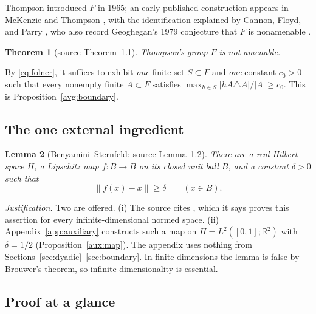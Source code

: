 \documentclass[11pt]{article}
\newcommand{\R}{\mathbb R}
\newcommand{\norm}[1]{\lVert #1\rVert}
\newtheorem{theorem}{Theorem}[section]
\newtheorem{lemma}[theorem]{Lemma}
\theoremstyle{definition}
\numberwithin{equation}{section}
\begin{document}
Thompson introduced \(F\) in 1965; an early published construction appears
in McKenzie and Thompson \cite{McKenzieThompson1973}, with the
identification explained by Cannon, Floyd, and Parry
\cite[pp.~215--216]{CannonFloydParry1996}, who also record Geoghegan's 1979
conjecture that \(F\) is nonamenable \cite[p.~227]{CannonFloydParry1996}.

\begin{theorem}[source Theorem~1.1]\label{thm:main}
Thompson's group \(F\) is not amenable.
\end{theorem}

By \eqref{eq:folner}, it suffices to exhibit \emph{one} finite set
\(S\subset F\) and \emph{one} constant \(c_0>0\) such that every nonempty
finite \(A\subset F\) satisfies
\(\max_{h\in S}|hA\triangle A|/|A|\ge c_0\). This is
Proposition~\ref{avg:boundary}.

\subsection{The one external ingredient}

\begin{lemma}[Benyamini--Sternfeld; source Lemma~1.2]\label{lem:displacement}
There are a real Hilbert space \(H\), a Lipschitz map \(f:B\to B\) on its
closed unit ball \(B\), and a constant \(\delta>0\) such that
\[
  \norm{f(x)-x}\ge\delta\qquad(x\in B).
\]
\end{lemma}

\noindent\emph{Justification.} Two are offered. (i) The source cites
\cite[Theorem, part~(3), p.~439]{BenyaminiSternfeld1983}, which it says
proves this assertion for every infinite-dimensional normed space.
(ii) Appendix~\ref{app:auxiliary} constructs such a map on
\(H=L^2([0,1];\R^2)\) with \(\delta=1/2\)
(Proposition~\ref{aux:map}). The appendix uses nothing from
Sections~\ref{sec:dyadic}--\ref{sec:boundary}. In finite dimensions the
lemma is false by Brouwer's theorem, so infinite dimensionality is
essential.

\subsection{Proof at a glance}\label{sec:glance}
\end{document}
